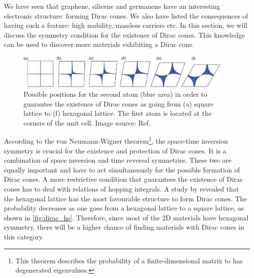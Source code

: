 We have seen that graphene, silicene and germanene have an interesting electronic structure: forming Dirac cones. We also have listed the consequences of having such a feature: high mobility, massless carriers etc. In this section, we will discuss the symmetry condition for the existence of Dirac cones. This knowledge can be used to discover more materials exhibiting a Dirac cone. 
\begin{figure}[htbp!] 
\centering  
\includegraphics[width=0.95\textwidth]{dirac_hs.png}
\caption{Possible positions for the second atom (blue area) in order to guarantee the existence of Dirac cones as going from (a) square lattice to (f) hexagonal lattice. The first atom is located at the corners of the unit cell. Image source: Ref. \cite{Liu2013} }  
\label{fig:dirac_hs}
\end{figure} 
According to the von Neumann-Wigner theorem\footnote{This theorem describes the probability of a finite-dimensional matrix to has degenerated eigenvalues.}, the space-time inversion symmetry is crucial for the existence and protection of Dirac cones\cite{Wang2015b}. It is a combination of space inversion and time reversal symmetries. These two are equally important and have to act simultaneously for the possible formation of Dirac cones. A more restrictive condition that guarantees the existence of Dirac cones has to deal with relations of hopping integrals\cite{Hasegawa2006,Liu2013}. A study by \citet{Liu2013} revealed that the hexagonal lattice has the most favourable structure to form Dirac cones. The probability decreases as one goes from a hexagonal lattice to a square lattice, as shown in \autoref{fig:dirac_hs}. Therefore, since most of the 2D materials have hexagonal symmetry, there will be a higher chance of finding materials with Dirac cones in this category.

